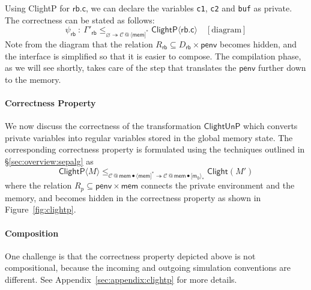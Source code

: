 \documentclass[acmsmall,screen,review,anonymous]{acmart}
\newcommand{\kw}[1]{\ensuremath{ \mathsf{#1} }}
\begin{document}
\begin{example}[Verifying $\kw{rb.c}$]
Using ClightP for $\kw{rb.c}$,
we can declare the variables
\texttt{c1}, \texttt{c2} and \texttt{buf}
as private.
The correctness can be stated as follows:
\[
  \psi_\kw{rb} \: : \: \Gamma'_\kw{rb}
    \le_{\varnothing \twoheadrightarrow
      \mathcal{C} \mathbin@ \langle \kw{mem} ]^*}
    \kw{ClightP}\langle \kw{rb.c} \rangle
    \quad
    [\text{diagram}]
\]
Note from the diagram that
the relation
$R_\kw{rb} \subseteq D_\kw{rb} \times \kw{penv}$
becomes hidden,
and the interface is simplified
so that it is easier to compose.
The compilation phase,
as we will see shortly,
takes care of the step that
translates the $\kw{penv}$ further down to the memory.
\end{example}

\paragraph{Correctness Property}
We now discuss the correctness of
the transformation $\kw{ClightUnP}$
which converts private variables into regular variables
stored in the global memory state.
The corresponding correctness property is
formulated using the techniques outlined in \S\ref{sec:overview:sepalg} as
\[
  \kw{ClightP}\langle M \rangle \le_{
    \mathcal{C} \mathbin@ \kw{mem} \bullet \langle \kw{mem} ]^*
    \twoheadrightarrow
    \mathcal{C} \mathbin@ \kw{mem} \bullet [ \kw{m_0} \rangle_*}
  \kw{Clight}(M')
\]
where the relation $R_p \subseteq \kw{penv} \times \kw{mem}$
connects the private environment and the memory,
and becomes hidden in the correctness property
as shown in Figure~\ref{fig:clightp}.


\paragraph{Composition}
One challenge is that the correctness property depicted above
is not compositional,
because the incoming and outgoing simulation conventions are different.
See Appendix~\ref{sec:appendix:clightp} for more details.
\end{document}
